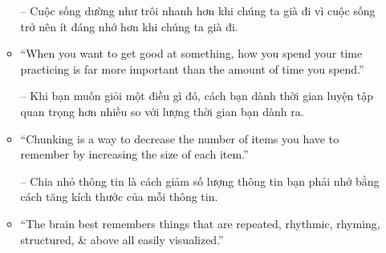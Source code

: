 \documentclass{article}
\begin{document}
\begin{enumerate}
\begin{itemize}
		-- Cuộc sống dường như trôi nhanh hơn khi chúng ta già đi vì cuộc sống trở nên ít đáng nhớ hơn khi chúng ta già đi.
		\item ``When you want to get good at something, how you spend your time practicing is far more important than the amount of time you spend.''
		
		-- Khi bạn muốn giỏi một điều gì đó, cách bạn dành thời gian luyện tập quan trọng hơn nhiều so với lượng thời gian bạn dành ra.
		\item ``Chunking is a way to decrease the number of items you have to remember by increasing the size of each item.''
		
		-- Chia nhỏ thông tin là cách giảm số lượng thông tin bạn phải nhớ bằng cách tăng kích thước của mỗi thông tin.		
		\item ``The brain best remembers things that are repeated, rhythmic, rhyming, structured, \& above all easily visualized.''
		

\end{itemize}
\end{enumerate}
\end{document}
